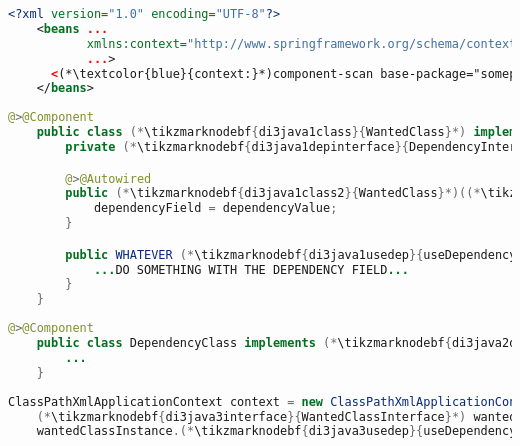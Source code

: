 \enlargethispage{20mm}
\thispagestyle{empty}
\label{constructorinjectionautowire}
\begin{lstlisting}[language=XML, title={Configuration XML}]
    <?xml version="1.0" encoding="UTF-8"?>
    <beans ...
           xmlns:context="http://www.springframework.org/schema/context"
           ...>
      <(*\textcolor{blue}{context:}*)component-scan base-package="somepackage.subpackage"/>
    </beans>
\end{lstlisting}
\begin{lstlisting}[language=Java, title={Wanted class with the constructor}]
    @>@Component
    public class (*\tikzmarknodebf{di3java1class}{WantedClass}*) implements (*\tikzmarknodebf{di3java1interface}{WantedClassInterface}*) {
        private (*\tikzmarknodebf{di3java1depinterface}{DependencyInterface}*) dependencyField;

        @>@Autowired
        public (*\tikzmarknodebf{di3java1class2}{WantedClass}*)((*\tikzmarknodebf{di3java1depinterface2}{DependencyInterface}*) dependencyValue) {
            dependencyField = dependencyValue;
        }

        public WHATEVER (*\tikzmarknodebf{di3java1usedep}{useDependency}*)() {
            ...DO SOMETHING WITH THE DEPENDENCY FIELD...
        }
    }
\end{lstlisting}
\begin{lstlisting}[language=Java, title={Dependency class}]
    @>@Component
    public class DependencyClass implements (*\tikzmarknodebf{di3java2depinterface}{DependencyInterface}*) {
        ...
    }
\end{lstlisting}
\begin{lstlisting}[language=Java, title={Usage}]
    ClassPathXmlApplicationContext context = new ClassPathXmlApplicationContext("configurationFile.xml");
    (*\tikzmarknodebf{di3java3interface}{WantedClassInterface}*) wantedClassInstance = context.getBean("(*\tikzmarknodebf{di3java3beanid}{wantedClass}[ForestGreen]*)", (*\tikzmarknodebf{di3java3interface2}{WantedClassInterface}*).class);
    wantedClassInstance.(*\tikzmarknodebf{di3java3usedep}{useDependency}*)();
\end{lstlisting}
\newpage

